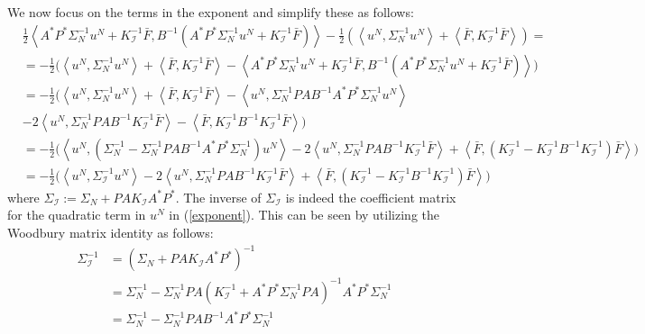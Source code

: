 \documentclass{article}
\theoremstyle{definition}
\theoremstyle{remark}
\begin{document}
We now focus on the terms in the exponent and simplify these as follows:
\begin{align}
    &\frac{1}{2}\left\langle A^{*}P^{*}\Sigma_{N}^{-1}u^{N} + K_{\mathcal{I}}^{-1}\bar{F}, B^{-1}\left(A^{*}P^{*}\Sigma_{N}^{-1}u^{N} + K_{\mathcal{I}}^{-1}\bar{F}\right) \right\rangle -\frac{1}{2}\left(\left\langle u^{N}, \Sigma_{N}^{-1}u^{N}\right\rangle + \left\langle \bar{F},K_{\mathcal{I}}^{-1}\bar{F} \right\rangle \right) =  \nonumber \\
    &=-\frac{1}{2}\Big( \left\langle u^{N}, \Sigma_{N}^{-1}u^{N}\right\rangle + \left\langle \bar{F}, K_{\mathcal{I}}^{-1}\bar{F} \right\rangle - \left\langle A^{*}P^{*}\Sigma_{N}^{-1}u^{N} + K_{\mathcal{I}}^{-1}\bar{F}, B^{-1}\left(A^{*}P^{*}\Sigma_{N}^{-1}u^{N} + K_{\mathcal{I}}^{-1}\bar{F}\right) \right\rangle \Big) \nonumber \\
    &=-\frac{1}{2}\Big(\left\langle u^{N}, \Sigma_{N}^{-1}u^{N}\right\rangle + \left\langle \bar{F}, K_{\mathcal{I}}^{-1}\bar{F} \right\rangle - \left\langle u^{N},\Sigma_{N}^{-1}PAB^{-1}A^{*}P^{*}\Sigma_{N}^{-1}u^{N} \right\rangle \nonumber \\
    &- 2\left\langle u^{N},\Sigma_{N}^{-1}PAB^{-1}K_{\mathcal{I}}^{-1}\bar{F} \right\rangle - \left\langle \bar{F}, K_{\mathcal{I}}^{-1}B^{-1}K_{\mathcal{I}}^{-1}\bar{F} \right\rangle \Big) \nonumber \\
    &= -\frac{1}{2}\Big( \left\langle u^{N}, (\Sigma_{N}^{-1} - \Sigma_{N}^{-1}PAB^{-1}A^{*}P^{*}\Sigma_{N}^{-1})u^{N} \right\rangle - 2 \left\langle u^{N},\Sigma_{N}^{-1}PAB^{-1}K_{\mathcal{I}}^{-1}\bar{F} \right\rangle + \left\langle \bar{F}, (K_{\mathcal{I}}^{-1}-K_{\mathcal{I}}^{-1}B^{-1}K_{\mathcal{I}}^{-1})\bar{F} \right\rangle \Big) \nonumber \\
    &=-\frac{1}{2}\Big( \left\langle u^{N}, \Sigma_{\mathcal{I}}^{-1}u^{N} \right\rangle - 2 \left\langle u^{N},\Sigma_{N}^{-1}PAB^{-1}K_{\mathcal{I}}^{-1}\bar{F} \right\rangle + \left\langle \bar{F}, (K_{\mathcal{I}}^{-1}-K_{\mathcal{I}}^{-1}B^{-1}K_{\mathcal{I}}^{-1})\bar{F} \right\rangle \Big) \label{exponent}
\end{align}
where $\Sigma_{\mathcal{I}}:=\Sigma_{N} + PAK_{\mathcal{I}}A^{*}P^{*}$. The inverse of $\Sigma_{\mathcal{I}}$ is indeed the coefficient matrix for the quadratic term in $u^{N}$ in (\ref{exponent}). This can be seen by utilizing the Woodbury matrix identity as follows:
\begin{align*}
    \Sigma_{\mathcal{I}}^{-1}&=(\Sigma_{N} + PAK_{\mathcal{I}}A^{*}P^{*})^{-1} \\
    &=\Sigma_{N}^{-1}-\Sigma_{N}^{-1}PA(K_{\mathcal{I}}^{-1}+A^{*}P^{*}\Sigma_{N}^{-1}PA)^{-1}A^{*}P^{*}\Sigma_{N}^{-1} \\
    &=\Sigma_{N}^{-1}-\Sigma_{N}^{-1}PAB^{-1}A^{*}P^{*}\Sigma_{N}^{-1}
\end{align*}
\end{document}
